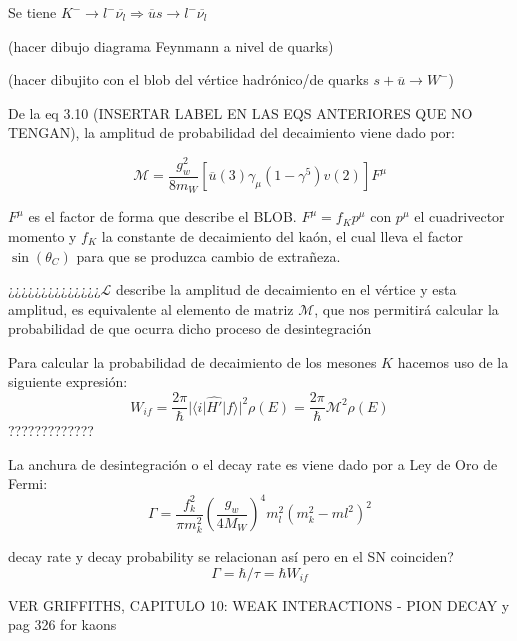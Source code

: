 Se tiene $K^{-} \rightarrow l^{-}\overline{\nu_{l}} \Rightarrow \overline{u}s \rightarrow l^{-}\overline{\nu_{l}}$

(hacer dibujo diagrama Feynmann a nivel de quarks)

(hacer dibujito con el blob del vértice hadrónico/de quarks $s+\overline{u} \rightarrow W^{-}$)

De la eq 3.10 (INSERTAR LABEL EN LAS EQS ANTERIORES QUE NO TENGAN), la amplitud de probabilidad del decaimiento viene dado por:

\begin{equation}
\mathcal{M}=\dfrac{g_{w}^{2}}{8m_{W}}\left[ \overline{u}\left( 3\right) \gamma _{\mu }\left( 1-\gamma ^{5}\right) v \left( 2\right) \right] F^{\mu }
\end{equation}

$F^{\mu }$ es el factor de forma que describe el BLOB. $F^{\mu }=f_Kp^{\mu}$ con $p^{\mu}$ el cuadrivector momento y $f_K$ la constante de decaimiento del kaón, el cual lleva el factor $\sin \left(\theta_C \right)$ para que se produzca cambio de extrañeza.

¿¿¿¿¿¿¿¿¿¿¿¿¿¿$\mathcal{L}$ describe la amplitud de decaimiento en el vértice y esta amplitud, es equivalente al elemento de matriz $\mathcal{M}$, que nos permitirá calcular la probabilidad de que ocurra dicho proceso de desintegración

Para calcular la probabilidad de decaimiento de los mesones $K$ hacemos uso de la siguiente expresión:
\begin{equation}
W_{if}= \dfrac{2\pi }{\hbar }\left| \langle i\right| \widehat{H'}| f\rangle| ^{2}\rho \left( E\right) = \dfrac{2\pi }{\hbar } \mathcal{M} ^{2}\rho \left( E\right)
\end{equation}
?????????????

La anchura de desintegración o el decay rate es viene dado por a Ley de Oro de Fermi:
\begin{equation}
\Gamma =\dfrac{f_{k}^{2}}{\pi m_{k}^{2}}\left( \dfrac{g_w}{4M_W}\right) ^{4} m_l^{2}\left( m_{k}^{2}-ml^{2}\right) ^{2}
\end{equation}

decay rate y decay probability se relacionan así pero en el SN coinciden?
\begin{equation}
\Gamma = {\hbar}/{\tau} = \hbar W_{if}
\end{equation}

VER GRIFFITHS, CAPITULO 10: WEAK INTERACTIONS - PION DECAY y pag 326 for kaons